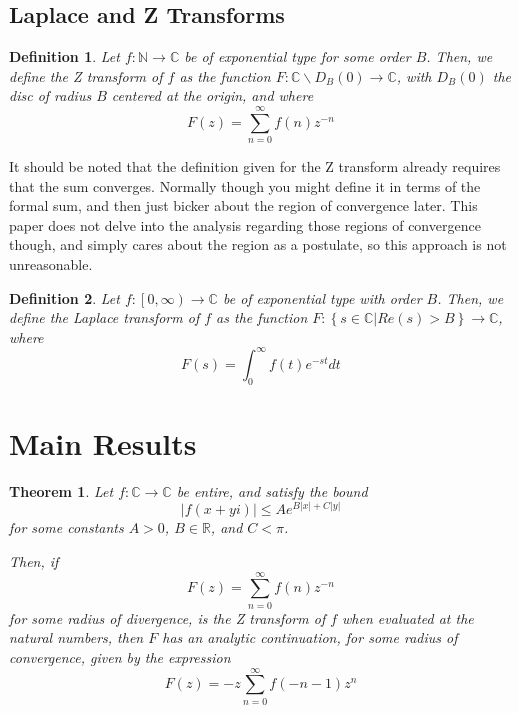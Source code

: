 \documentclass{article}
\newtheorem{definition}{Definition}
\newtheorem{theorem}{Theorem}
\begin{document}
	

	\subsection{Laplace and Z Transforms}

	\begin{definition} \label{ def_Z_Transform }
		Let $ f : \mathbb{N} \rightarrow \mathbb{C} $ be of exponential type for some order $B$. Then, we define the Z transform of $f$ as the function $F : \mathbb{C} \backslash D_{B}(0) \rightarrow \mathbb{C}$, with $D_{B}(0)$ the disc of radius $B$ centered at the origin, and where
		$$ F \left( z \right) = \sum_{n = 0}^{\infty} f \left( n \right) z^{-n} $$
	\end{definition}

	It should be noted that the definition given for the Z transform already requires that the sum converges. Normally though you might define it in terms of the formal sum, and then just bicker about the region of convergence later. This paper does not delve into the analysis regarding those regions of convergence though, and simply cares about the region as a postulate, so this approach is not unreasonable. 
	
	\begin{definition} \label{ def_Laplace_Transform }
		Let $ f : \left[ 0, \infty \right) \rightarrow \mathbb{C}$ be of exponential type with order $B$. Then, we define the Laplace transform of $f$ as the function $ F : \left\{ s \in \mathbb{C} | Re(s) > B \right\} \rightarrow \mathbb{C}$, where
		$$ F(s) = \int_{0}^{\infty} f(t) e^{-s t} dt $$
	\end{definition}

	\section{ Main Results }
	
	\begin{theorem} \label{z_transform_analytic_continuation}
		 Let $f : \mathbb{C} \rightarrow \mathbb{C}$ be entire, and satisfy the bound $$ \left| f(x + y i ) \right| \leq A e^{ B \left| x \right| + C \left| y \right| } $$ for some constants $A > 0$, $B \in \mathbb{R}$, and $C < \pi$.
		 
		 
		 Then, if $$F(z) = \sum_{n=0}^{\infty} f(n) z^{-n} $$ for some radius of divergence, is the Z transform of $f$ when evaluated at the natural numbers, then $F$ has an analytic continuation, for some radius of convergence, given by the expression 
		 $$ F(z) = -z\sum_{n=0}^{\infty} f(-n-1) z^{n} $$
	\end{theorem}
\end{document}
